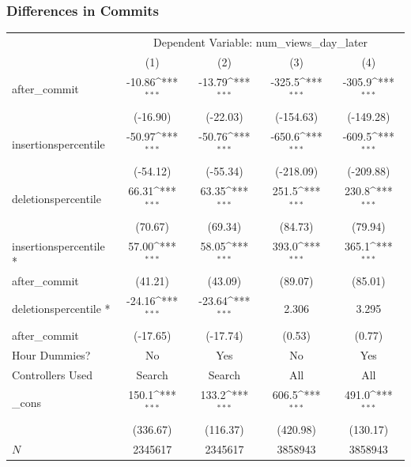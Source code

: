 \documentclass[xcolor=pdftex,dvipsnames,table]{beamer}
\begin{document}
\frame
{
    \frametitle{Differences in Commits}
    \begin{table}
    \centering
    \scriptsize
    {
        \def\sym#1{\ifmmode^{#1}\else\(^{#1}\)\fi}
        \begin{tabular}{l*{4}{c}}
        \hline\hline
            & \multicolumn{4}{c}{Dependent Variable: num\_views\_day\_later} \\
            &\multicolumn{1}{c}{(1)}&\multicolumn{1}{c}{(2)}&\multicolumn{1}{c}{(3)}&\multicolumn{1}{c}{(4)}\\
            \hline
            after\_commit&      -10.86\sym{***}&      -13.79\sym{***}&      -325.5\sym{***}&      -305.9\sym{***}\\
            &    (-16.90)         &    (-22.03)         &   (-154.63)         &   (-149.28)         \\
            [0.5em]
            insertionspercentile&      -50.97\sym{***}&      -50.76\sym{***}&      -650.6\sym{***}&      -609.5\sym{***}\\
            &    (-54.12)         &    (-55.34)         &   (-218.09)         &   (-209.88)         \\
            [0.5em]
            deletionspercentile&       66.31\sym{***}&       63.35\sym{***}&       251.5\sym{***}&       230.8\sym{***}\\
            &     (70.67)         &     (69.34)         &     (84.73)         &     (79.94)         \\
            [0.5em]
            insertionspercentile *&       57.00\sym{***}&       58.05\sym{***}&       393.0\sym{***}&       365.1\sym{***}\\
            after\_commit&     (41.21)         &     (43.09)         &     (89.07)         &     (85.01)         \\
            [0.5em]
            deletionspercentile * &      -24.16\sym{***}&      -23.64\sym{***}&       2.306         &       3.295         \\
            after\_commit&    (-17.65)         &    (-17.74)         &      (0.53)         &      (0.77)         \\
            [0.5em]
            Hour Dummies?&      No               &    Yes &          No           &     Yes\\
            [0.5em]
            Controllers Used&      Search               &    Search &         All           &     All\\
            [0.5em]
            \_cons      &       150.1\sym{***}&       133.2\sym{***}&       606.5\sym{***}&       491.0\sym{***}\\
            &    (336.67)         &    (116.37)         &    (420.98)         &    (130.17)         \\
            \hline
            \(N\)       &     2345617         &     2345617         &     3858943         &     3858943         \\
            \hline\hline
        \end{tabular}
        }
    \end{table}
}
\end{document}
